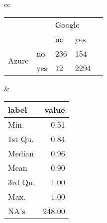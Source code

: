 \begin{tabular}{cc}
    \begin{minipage}{.5\linewidth}
        \begin{tabular}{ll|l|l|l}
\cline{3-4}
                                             &     & \multicolumn{2}{l|}{Google} &  \\ \cline{3-4}
                                             &     & no           & yes          &  \\ \cline{1-4}
\multicolumn{1}{|l|}{\multirow{2}{*}{Azure}} & no  & 236          & 154           &  \\ \cline{2-4}
\multicolumn{1}{|l|}{}                       & yes & 12            & 2294         &  \\ \cline{1-4}
\end{tabular}
    \end{minipage} &

    \begin{minipage}{.5\linewidth}
        \begin{tabular}{lr}
  \hline
 label & value \\ 
  \hline
Min.    & 0.51 \\ 
1st Qu. & 0.84 \\ 
Median  & 0.96 \\ 
Mean    & 0.90 \\ 
3rd Qu. & 1.00 \\ 
Max.    & 1.00 \\ 
NA's    & 248.00 \\ 
   \hline
\end{tabular}
    \end{minipage} 
\end{tabular}